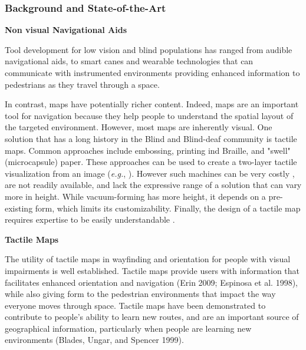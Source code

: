 
\subsubsection{Background and State-of-the-Art}

\textbf{Non visual Navigational Aids}

Tool development for low vision and blind populations has ranged from audible navigational aids, to smart canes and wearable technologies that can communicate with instrumented environments providing enhanced information to pedestrians as they travel through a space. 

In contrast, maps have potentially richer content. Indeed, maps are an important tool for  navigation because they help people to understand the spatial layout of the targeted environment. However, most maps are inherently visual. One solution that has a long history in the Blind and Blind-deaf community is tactile maps. Common approaches include embossing, printing ind Braille, and "swell" (microcapsule) paper. These approaches can be used to create a two-layer tactile visualization from an image (\textit{e.g.}, \cite{miele2006talking}). However such machines can be very costly \cite{rice2005design}, are not readily available, and lack the expressive range of a solution that can vary more in height. While vacuum-forming has more height, it depends on a pre-existing form, which limits its customizability. Finally, the design of a tactile map requires expertise to be easily understandable \cite{tatham1991design}.


\textbf{Tactile Maps}

The utility of tactile maps in wayfinding and orientation for people with visual impairments is well established. Tactile maps provide users with information that facilitates enhanced orientation and navigation (Erin 2009; Espinosa et al. 1998), while also giving form to the pedestrian environments that impact the way everyone moves through space. 
Tactile maps have been demonstrated to contribute to people’s ability to learn new routes, and are an important source of geographical information, particularly when people are learning new environments (Blades, Ungar, and Spencer 1999). 

